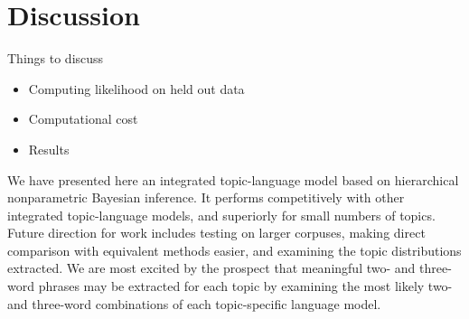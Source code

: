\section{Discussion}

Things to discuss 
\begin{itemize}
\item Computing likelihood on held out data
\item Computational cost
\item Results
\end{itemize}

We have presented here an integrated topic-language model based on hierarchical nonparametric Bayesian inference.  It performs competitively with other integrated topic-language models, and superiorly for small numbers of topics.  Future direction for work includes testing on larger corpuses, making direct comparison with equivalent methods easier, and examining the topic distributions extracted.  We are most excited by the prospect that meaningful two- and three-word phrases may be extracted for each topic by examining the most likely two- and three-word combinations of each topic-specific language model.